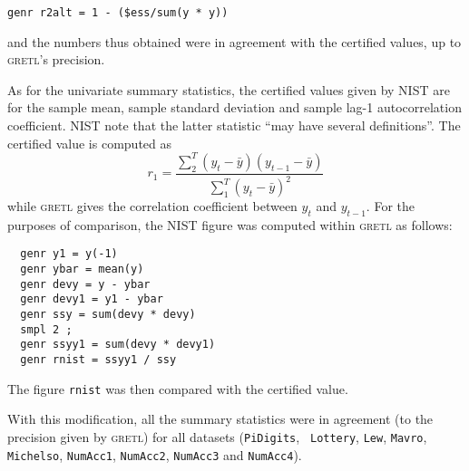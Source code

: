 \documentclass{article}
\begin{document}
\begin{center}
\texttt{genr r2alt = 1 - (\$ess/sum(y * y))}  
\end{center}

\noindent and the numbers thus
obtained were in agreement with the certified values, up to
\textsc{gretl}'s precision.

As for the univariate summary statistics, the certified values given
by NIST are for the sample mean, sample standard deviation and sample
lag-1 autocorrelation coefficient.  NIST note that the latter
statistic ``may have several definitions''.  The certified value is
computed as 
$$r_1 = \frac{\sum^T_2 (y_t - \bar{y})(y_{t-1} - \bar{y})}%
{\sum^T_1 (y_t - \bar{y})^2}$$
while \textsc{gretl} gives the
correlation coefficient between $y_t$ and $y_{t-1}$.  For the purposes
of comparison, the NIST figure was computed within \textsc{gretl} as
follows:

\begin{verbatim}
  genr y1 = y(-1)
  genr ybar = mean(y)
  genr devy = y - ybar
  genr devy1 = y1 - ybar
  genr ssy = sum(devy * devy)
  smpl 2 ;
  genr ssyy1 = sum(devy * devy1)
  genr rnist = ssyy1 / ssy
\end{verbatim}

\noindent The figure \texttt{rnist} was then compared with the certified value.

With this modification, all the summary statistics were in agreement
(to the precision given by \textsc{gretl}) for all datasets
(\texttt{PiDigits}, \texttt{ Lottery}, \texttt{Lew}, \texttt{Mavro},
\texttt{Michelso}, \texttt{NumAcc1}, \texttt{NumAcc2},
\texttt{NumAcc3} and \texttt{NumAcc4}).
\end{document}
